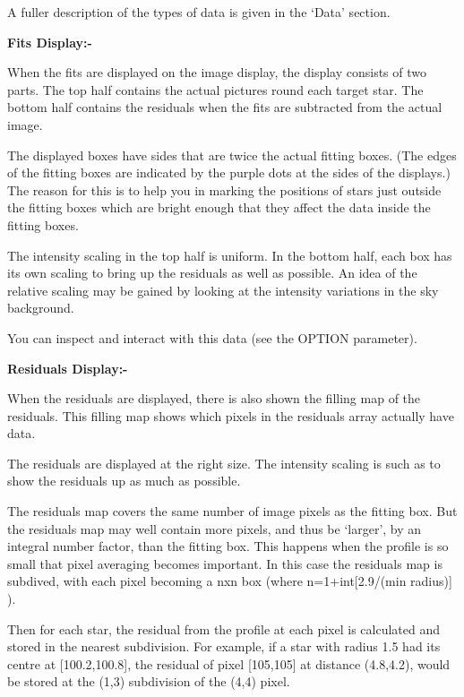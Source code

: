 \begin{small}
{{  A fuller description of the types of data is given in the `Data'
  section.
 
{\bf \hspace*{2em} Fits Display:-}
 
  When the fits are displayed on the image display, the display
  consists of two parts. The top half contains the actual pictures round
  each target star. The bottom half contains the residuals when the fits
  are subtracted from the actual image.
 
  The displayed boxes have sides that are twice the actual fitting
  boxes. (The edges of the fitting boxes are indicated by the purple
  dots at the sides of the displays.) The reason for this is to help
  you in marking the positions of stars just outside the fitting boxes
  which are bright enough that they affect the data inside the fitting
  boxes.
 
  The intensity scaling in the top half is uniform. In the bottom half,
  each box has its own scaling to bring up the residuals as well as
  possible. An idea of the relative scaling may be gained by looking at
  the intensity variations in the sky background.
 
  You can inspect and interact with this data (see the OPTION parameter).
 
{\bf \hspace*{2em} Residuals Display:-}
 
  When the residuals are displayed, there is also shown the filling map
  of the residuals. This filling map shows which pixels in the
  residuals array actually have data.
 
  The residuals are displayed at the right size. The intensity scaling is
  such as to show the residuals up as much as possible.
 
  The residuals map covers the same number of image pixels as the
  fitting box. But the residuals map may well contain more pixels, and
  thus be `larger', by an integral number factor, than the fitting box.
  This happens when the profile is so small that pixel averaging
  becomes important. In this case the residuals map is subdived, with
  each pixel becoming a nxn box (where n=1+int[2.9/(min radius)] ).
 
  Then for each star, the residual from the profile at each pixel is
  calculated and stored in the nearest subdivision. For example, if a
  star with radius 1.5 had its centre at [100.2,100.8], the residual of
  pixel [105,105] at distance (4.8,4.2), would be stored at the (1,3)
  subdivision of the (4,4) pixel.
 
}}
\end{small}
